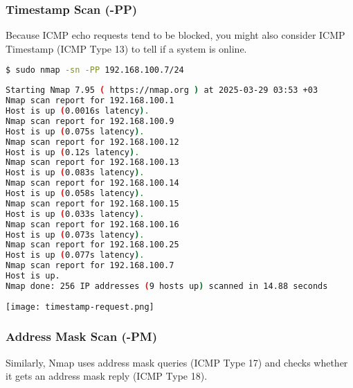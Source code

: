 \documentclass[11pt,a4paper]{article}
\newenvironment{commandbox}[1][]{
    \begin{tcolorbox}[
        colback=kalibackground,   
        colframe=commandcolor,    
        fonttitle=\bfseries\color{white},  
        title=#1,               
        breakable=true           
    ]
}{
    \end{tcolorbox}
}
\begin{document}
\clearpage

\subsubsection{Timestamp Scan (-PP)}

Because ICMP echo requests tend to be blocked, you might also consider ICMP Timestamp (ICMP Type 13) to tell if a system is online.

\begin{commandbox}[ICMP Timestamp Scan (-PP)]
\begin{lstlisting}[language=bash, style=bash, basicstyle=\small\ttfamily\color{warningcolor}]
$ sudo nmap -sn -PP 192.168.100.7/24
\end{lstlisting}

\begin{lstlisting}[basicstyle=\small\ttfamily\color{kalitext}, language=bash, style=bash, breaklines=true, breakindent=0pt]
Starting Nmap 7.95 ( https://nmap.org ) at 2025-03-29 03:53 +03
Nmap scan report for 192.168.100.1
Host is up (0.0016s latency).
Nmap scan report for 192.168.100.9
Host is up (0.075s latency).
Nmap scan report for 192.168.100.12
Host is up (0.12s latency).
Nmap scan report for 192.168.100.13
Host is up (0.083s latency).
Nmap scan report for 192.168.100.14
Host is up (0.058s latency).
Nmap scan report for 192.168.100.15
Host is up (0.033s latency).
Nmap scan report for 192.168.100.16
Host is up (0.073s latency).
Nmap scan report for 192.168.100.25
Host is up (0.077s latency).
Nmap scan report for 192.168.100.7
Host is up.
Nmap done: 256 IP addresses (9 hosts up) scanned in 14.88 seconds
\end{lstlisting}
\end{commandbox}
\vspace{-5pt}

\begin{center}
    \texttt{[image: timestamp-request.png]}
    \label{fig:timestamp-request}
    \end{center}

\clearpage
\subsubsection{Address Mask Scan (-PM)}

Similarly, Nmap uses address mask queries (ICMP Type 17) and checks whether it gets an address mask reply (ICMP Type 18).
\end{document}
